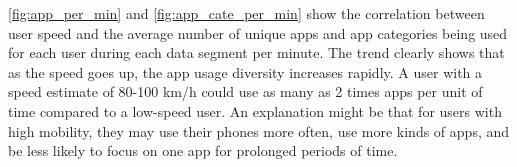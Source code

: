 \autoref{fig:app_per_min} and \autoref{fig:app_cate_per_min} 
show the correlation between user speed and the average number of unique apps and app categories being used for each user during each data segment per minute.
The trend clearly shows that as the speed goes up, the app usage diversity increases rapidly.
A user with a speed estimate of 80-100 km/h could use as many as 2 times apps per unit of time compared to a low-speed user.
An explanation might be that for users with high mobility, they may use their phones more often, use more kinds of apps, and be less likely to focus on one app for prolonged periods of time. 


